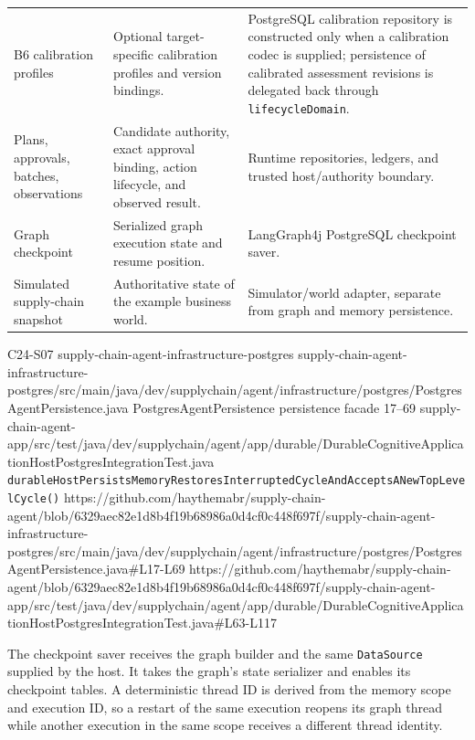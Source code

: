 \begin{longtable}{P{0.20\textwidth} P{0.36\textwidth} P{0.35\textwidth}}
B6 calibration profiles & Optional target-specific calibration profiles and version bindings. & PostgreSQL calibration repository is constructed only when a calibration codec is supplied; persistence of calibrated assessment revisions is delegated back through \texttt{lifecycleDomain}. \\
Plans, approvals, batches, observations & Candidate authority, exact approval binding, action lifecycle, and observed result. & Runtime repositories, ledgers, and trusted host/authority boundary. \\
Graph checkpoint & Serialized graph execution state and resume position. & LangGraph4j PostgreSQL checkpoint saver. \\
Simulated supply-chain snapshot & Authoritative state of the example business world. & Simulator/world adapter, separate from graph and memory persistence. \\
\bottomrule
\end{longtable}

\BookSourceReferenceNoQR
  {C24-S07}
  {supply-chain-agent-infrastructure-postgres}
  {supply-chain-agent-infrastructure-postgres/src/main/java/dev/supplychain/agent/infrastructure/postgres/PostgresAgentPersistence.java}
  {PostgresAgentPersistence persistence facade}
  {17--69}
  {supply-chain-agent-app/src/test/java/dev/supplychain/agent/app/durable/DurableCognitiveApplicationHostPostgresIntegrationTest.java}
  {\texttt{durableHostPersistsMemoryRestoresInterruptedCycleAndAcceptsANewTopLevelCycle()}}
  {https://github.com/haythemabr/supply-chain-agent/blob/6329aec82e1d8b4f19b68986a0d4cf0c448f697f/supply-chain-agent-infrastructure-postgres/src/main/java/dev/supplychain/agent/infrastructure/postgres/PostgresAgentPersistence.java\#L17-L69}
  {https://github.com/haythemabr/supply-chain-agent/blob/6329aec82e1d8b4f19b68986a0d4cf0c448f697f/supply-chain-agent-app/src/test/java/dev/supplychain/agent/app/durable/DurableCognitiveApplicationHostPostgresIntegrationTest.java\#L63-L117}

The checkpoint saver receives the graph builder and the same \texttt{DataSource} supplied by the host. It takes the graph's state serializer and enables its checkpoint tables. A deterministic thread ID is derived from the memory scope and execution ID, so a restart of the same execution reopens its graph thread while another execution in the same scope receives a different thread identity.

